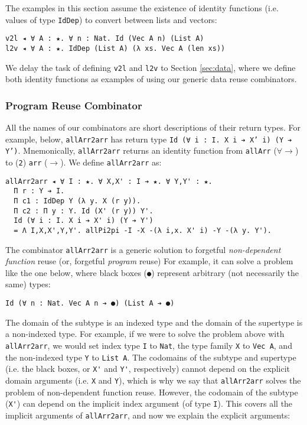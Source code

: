 \documentclass[acmsmall]{acmart}\settopmatter{}
\newcommand{\refsec}[1]{Section \ref{sec:#1}}
\begin{document}
The examples in this section assume the existence of
identity functions (i.e. values of type \verb;IdDep;)
to convert between lists and vectors:
\begin{verbatim}
v2l ◂ ∀ A : ★. ∀ n : Nat. Id (Vec A n) (List A)
l2v ◂ ∀ A : ★. IdDep (List A) (λ xs. Vec A (len xs))
\end{verbatim}
We delay the task of defining \verb;v2l; and \verb;l2v; to
\refsec{data}, where we define both identity functions as examples
of using our generic data reuse combinators.

\subsubsection{Program Reuse Combinator}

All the names of our combinators are short descriptions of their
return types. For example, below, \verb;allArr2arr; has return type
\texttt{Id (∀ i : I. X i ➔ X' i) (Y ➔ Y')}. Mnemonically,
\verb;allArr2arr; returns an identity function from \verb;allArr;
($\forall\rightarrow$) to (\verb;2;) \verb;arr; ($\rightarrow$).
We define \verb;allArr2arr; as:
\begin{verbatim}
allArr2arr ◂ ∀ I : ★. ∀ X,X' : I ➔ ★. ∀ Y,Y' : ★.
  Π r : Y ➔ I.
  Π c1 : IdDep Y (λ y. X (r y)).
  Π c2 : Π y : Y. Id (X' (r y)) Y'.
  Id (∀ i : I. X i ➔ X' i) (Y ➔ Y')
  = Λ I,X,X',Y,Y'. allPi2pi -I -X -(λ i,x. X' i) -Y -(λ y. Y').
\end{verbatim}
The combinator \verb;allArr2arr; is a generic solution to forgetful
\textit{non-dependent function} reuse (or, forgetful \textit{program}
reuse) For example, it can solve a problem like the one below, where black boxes
(\verb;●;) represent arbitrary (not necessarily the same) types:
\begin{verbatim}
Id (∀ n : Nat. Vec A n ➔ ●) (List A ➔ ●)
\end{verbatim}
The domain of the subtype is an indexed type
and the domain of the supertype is a non-indexed type.
For example, if
we were to solve the problem above with \verb;allArr2arr;, we would set
index type \verb;I; to \verb;Nat;, the type family \verb;X; to
\verb;Vec A;, and the non-indexed type \verb;Y; to \verb;List A;.
The codomains of the subtype and supertype
(i.e. the black boxes, or \verb;X'; and \verb;Y';, respectively)
cannot depend on the
explicit domain arguments (i.e. \verb;X; and \verb;Y;),
which is why we say that \verb;allArr2arr; solves the problem of
non-dependent function reuse.
However, the codomain of the subtype (\verb;X';)
can depend on the implicit index argument (of type \verb;I;).
This covers all the implicit arguments of \verb;allArr2arr;,
and now we explain the explicit arguments:
\end{document}
